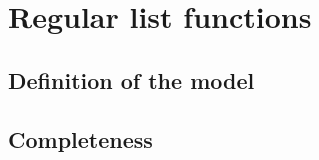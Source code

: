 \section{Regular list functions}
\label{sec:regular-list-functions}

\subsection{Definition of the model}
\subsection{Completeness}